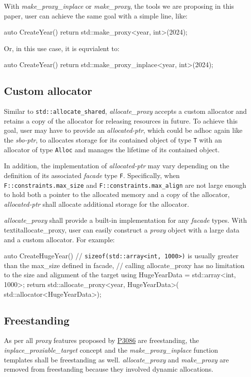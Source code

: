 \documentclass[10pt, a4paper, oneside]{article}
\begin{document}
With \textit{make\_proxy\_inplace} or \textit{make\_proxy},
the tools we are proposing in this paper,
user can achieve the same goal with a simple line, like:
\begin{codeblock}
auto CreateYear() {
  return std::make_proxy<year, int>(2024);
}
\end{codeblock}
Or, in this use case, it is equvialent to:
\begin{codeblock}
auto CreateYear() {
  return std::make_proxy_inplace<year, int>(2024);
}
\end{codeblock}

\subsection{Custom allocator}
Similar to \verb|std::allocate_shared|,
\textit{allocate\_proxy} accepts a custom allocator and retains a copy of the allocator for releasing resources in future.
To achieve this goal,
user may have to provide an \textit{allocated-ptr},
which could be adhoc again like the \textit{sbo-ptr},
to allocates storage for its contained object of type \verb|T| with an allocator of type \verb|Alloc| and manages the lifetime of its contained object.

In addition, the implementation of \textit{allocated-ptr} may vary depending on the definition of its associated \textit{facade} type \verb|F|.
Specifically, when \verb|F::constraints.max_size| and \verb|F::constraints.max_align| are not large enough to hold both a pointer to the allocated memory and a copy of the allocator,
\textit{allocated-ptr} shall allocate additional storage for the allocator.

\textit{allocate\_proxy} shall provide a built-in implementation for any \textit{facade} types.
With textit{allocate\_proxy}, user can easily construct a \textit{proxy} object with a large data and a custom allocator.
For example:
\begin{codeblock}
auto CreateHugeYear(){
  // \verb|sizeof(std::array<int, 1000>)| is usually greater than the max\_size defined in facade,
  // calling allocate\_proxy has no limitation to the size and alignment of the target
  using HugeYearData = std::array<int, 1000>;
  return std::allocate_proxy<year, HugeYearData>(
    std::allocator<HugeYearData>{});
}
\end{codeblock}

\subsection{Freestanding}
As per all \textit{proxy} features proposed by \href{https://wg21.link/p3086}{P3086} are freestanding,
the \textit{inplace\_proxiable\_target} concept and the \textit{make\_proxy\_inplace} function templates shall be freestanding as well.
\textit{allocate\_proxy} and \textit{make\_proxy} are removed from freestanding because they involved dynamic allocations.
\end{document}
